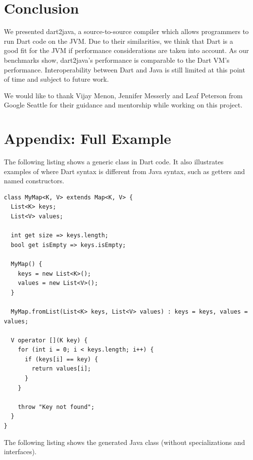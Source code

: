 \documentclass[sigplan,9pt]{acmart}
\begin{document}
\section{Conclusion}
We presented dart2java, a source-to-source compiler which allows programmers to run Dart code on the JVM.  Due to their similarities, we think that Dart is a good fit for the JVM if performance considerations are taken into account. As our benchmarks show, dart2java's performance is comparable to the Dart VM's performance. Interoperability between Dart and Java is still limited at this point of time and subject to future work.

\begin{acks} 
We would like to thank Vijay Menon, Jennifer Messerly and Leaf Peterson from Google Seattle for their guidance and mentorship while working on this project. 
\end{acks}






\appendix
\section{Appendix: Full Example}
The following listing shows a generic class in Dart code. It also  illustrates examples of where Dart syntax is different from Java syntax, such as getters and named constructors.

\begin{lstlisting}
class MyMap<K, V> extends Map<K, V> {
  List<K> keys;
  List<V> values;

  int get size => keys.length;
  bool get isEmpty => keys.isEmpty;

  MyMap() {
    keys = new List<K>();
    values = new List<V>();
  }

  MyMap.fromList(List<K> keys, List<V> values) : keys = keys, values = values;

  V operator [](K key) {
    for (int i = 0; i < keys.length; i++) {
      if (keys[i] == key) {
        return values[i];
      }
    }

    throw "Key not found";
  }
}
\end{lstlisting}

The following listing shows the generated Java class (without specializations and interfaces).
\end{document}
